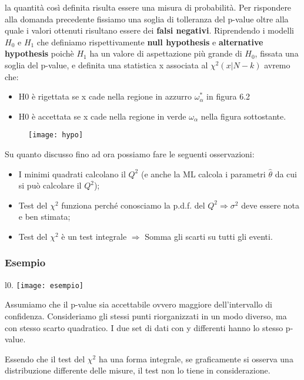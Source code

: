 \documentclass[11pt,a4paper]{book}
\begin{document}
\noindent la quantit\`{a} cos\`{i} definita risulta essere una misura di probabilit\`{a}. Per rispondere alla domanda precedente fissiamo una soglia di tolleranza del p-value oltre alla quale i valori ottenuti risultano essere dei \textbf{falsi negativi}. Riprendendo i modelli $H_0$ e $H_1$ che definiamo rispettivamente \textbf{null hypothesis} e \textbf{alternative hypothesis} poich\`{e} $H_1$ ha un valore di aspettazione pi\`{u} grande di $H_0$, fissata una soglia del p-value, e definita una statistica x associata al $\chi^2(x \vert N-k)$ avremo che:
\begin{itemize}
	\item H0 \`{e} rigettata se x cade nella regione in azzurro $\omega_\alpha^* $ in figura 6.2
	\item H0 \`{e} accettata se x cade nella regione in verde $\omega_\alpha$ nella figura sottostante.
\end{itemize}
\begin{figure}[ht]
\texttt{[image: hypo]}	
\centering
\end{figure}
Su quanto discusso fino ad ora possiamo fare le seguenti osservazioni:
\begin{itemize}
	\item I minimi quadrati calcolano il $Q^2$ (e anche la ML calcola i parametri $\hat{\theta}$ da cui si può calcolare il $Q^2$);
	\item Test del $\chi^2$ funziona perché conosciamo la p.d.f. del $Q^2 \Rightarrow \sigma^2$  deve essere nota e ben stimata;
	\item Test del $\chi^2$ è un test integrale $\Rightarrow$ Somma gli scarti su tutti gli eventi.
\end{itemize}

\subsubsection{Esempio}

\begin{wrapfigure}{l}{0.\textwidth}
\centering
\texttt{[image: esempio]}	
\end{wrapfigure}

Assumiamo che il p-value sia accettabile ovvero maggiore
dell'intervallo di confidenza. Consideriamo gli stessi punti 
riorganizzati in un modo diverso, ma con stesso scarto quadratico.
I due set di dati con y differenti hanno lo stesso p-value.

Essendo che il test del $\chi^2$ ha una forma integrale, se
graficamente si osserva una distribuzione differente delle
misure, il test non lo tiene in considerazione.
\end{document}
